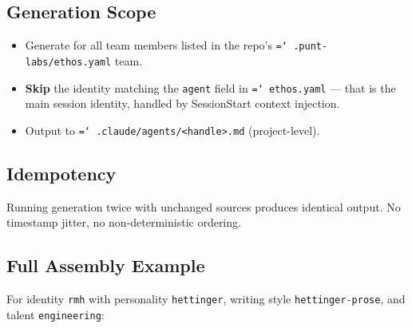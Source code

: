 \documentclass[a4paper,10pt]{article}
\newcommand{\fpath}[1]{\texttt{\hyphenchar\font=`\/ #1}}
\newcommand{\field}[1]{\texttt{#1}}
\begin{document}
\subsection{Generation Scope}

\begin{itemize}
  \item Generate for all team members listed in the repo's
    \fpath{.punt-labs/ethos.yaml} team.
  \item \textbf{Skip} the identity matching the \field{agent} field
    in \fpath{ethos.yaml} --- that is the main session identity,
    handled by SessionStart context injection.
  \item Output to \fpath{.claude/agents/<handle>.md} (project-level).
\end{itemize}

\subsection{Idempotency}

Running generation twice with unchanged sources produces identical
output. No timestamp jitter, no non-deterministic ordering.

\subsection{Full Assembly Example}

For identity \texttt{rmh} with personality \texttt{hettinger},
writing style \texttt{hettinger-prose}, and talent
\texttt{engineering}:
\end{document}

